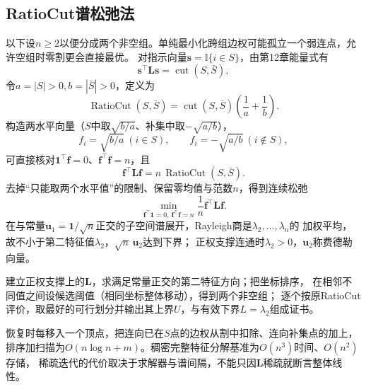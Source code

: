 \subsection{RatioCut谱松弛法}
\label{sec:graph-theory-ratio-cut}
以下设$n\geq2$以便分成两个非空组。单纯最小化跨组边权可能孤立一个弱连点，允许空组时零割更会直接最优。
对指示向量$\bm s=\mathbb I\{i\in S\}$，由第12章能量式有
\begin{equation}
  \bm s^\top\bm L\bm s=\operatorname{cut}(S,\bar S),
  \label{eq:graph-theory-indicator-cut-energy}
\end{equation}
令$a=|S|>0,b=|\bar S|>0$，定义为
\begin{equation}
  \operatorname{RatioCut}(S,\bar S)=\operatorname{cut}(S,\bar S)\left(\frac1a+\frac1b\right).
  \label{eq:graph-theory-ratio-cut}
\end{equation}
构造两水平向量（$S$中取$\sqrt{b/a}$、补集中取$-\sqrt{a/b}$），
\begin{equation}
  f_i=\sqrt{b/a}\ (i\in S),\qquad f_i=-\sqrt{a/b}\ (i\notin S),
  \label{eq:graph-theory-ratio-cut-balanced-vector}
\end{equation}
可直接核对$\bm1^\top\bm f=0$、$\bm f^\top\bm f=n$，且
\begin{equation}
  \bm f^\top\bm L\bm f=n\,\operatorname{RatioCut}(S,\bar S).
  \label{eq:graph-theory-ratio-cut-energy}
\end{equation}
去掉“只能取两个水平值”的限制、保留零均值与范数$n$，得到连续松弛
\begin{equation}
  \min_{\bm f^\top\bm1=0,\ \bm f^\top\bm f=n}\frac1n\bm f^\top\bm L\bm f.
  \label{eq:graph-theory-ratio-cut-relaxation}
\end{equation}
在与常量$\bm u_1=\bm1/\sqrt n$正交的子空间谱展开，Rayleigh商是$\lambda_2,\ldots,\lambda_n$的
加权平均，故不小于第二特征值$\lambda_2$，$\sqrt n\,\bm u_2$达到下界；
正权支撑连通时$\lambda_2>0$，$\bm u_2$称费德勒向量。
\begin{algorithm}[谱划分与恢复]
  建立正权支撑上的$\bm L$，求满足常量正交的第二特征方向；把坐标排序，
  在相邻不同值之间设候选阈值（相同坐标整体移动），得到两个非空组；
  逐个按原RatioCut评价，取最好的可行划分并输出其上界$U$，与有效下界$L=\lambda_2$组成证书。
\end{algorithm}
恢复时每移入一个顶点，把连向已在$S$点的边权从割中扣除、连向补集点的加上，
排序加扫描为$O(n\log n+m)$。稠密完整特征分解基准为$O(n^3)$时间、$O(n^2)$存储，
稀疏迭代的代价取决于求解器与谱间隔，不能只因$\bm L$稀疏就断言整体线性。


